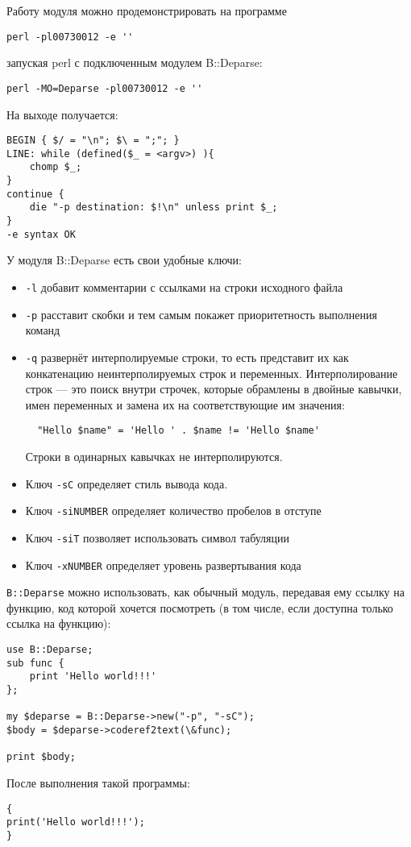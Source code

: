 Работу модуля можно продемонстрировать на программе
\begin{verbatim}
perl -pl00730012 -e ''
\end{verbatim}
запуская perl с подключенным модулем B::Deparse:
\begin{verbatim}
perl -MO=Deparse -pl00730012 -e ''
\end{verbatim}
На выходе получается:
\begin{verbatim}
BEGIN { $/ = "\n"; $\ = ";"; }
LINE: while (defined($_ = <argv>) ){
    chomp $_;
}
continue {
    die "-p destination: $!\n" unless print $_;
}
-e syntax OK
\end{verbatim}
У модуля B::Deparse есть свои удобные ключи:
\begin{itemize}
  \item \verb|-l| добавит комментарии с ссылками на строки исходного файла
  \item \verb|-p| расставит скобки и тем самым покажет приоритетность выполнения команд
  \item \verb|-q| развернёт интерполируемые строки, то есть представит их как конкатенацию неинтерполируемых строк и переменных. Интерполирование строк --- это поиск внутри строчек, которые обрамлены в двойные кавычки, имен переменных и замена их на соответствующие им значения:
  \begin{verbatim}
  "Hello $name" = 'Hello ' . $name != 'Hello $name'
  \end{verbatim}
  Строки в одинарных кавычках не интерполируются.
  \item Ключ \verb|-sС| определяет стиль вывода кода.
  \item Ключ \verb|-siNUMBER| определяет количество пробелов в отступе
  \item Ключ \verb|-siT| позволяет использовать символ табуляции
  \item Ключ \verb|-xNUMBER| определяет уровень развертывания кода
\end{itemize}
\verb|B::Deparse| можно использовать, как обычный модуль, передавая ему ссылку на функцию, код которой хочется посмотреть (в том числе, если доступна только ссылка на функцию):
\begin{verbatim}
use B::Deparse;
sub func {
    print 'Hello world!!!'
};

my $deparse = B::Deparse->new("-p", "-sC");
$body = $deparse->coderef2text(\&func);

print $body;
\end{verbatim}
После выполнения такой программы:
\begin{verbatim}
{
print('Hello world!!!');
}
\end{verbatim}

